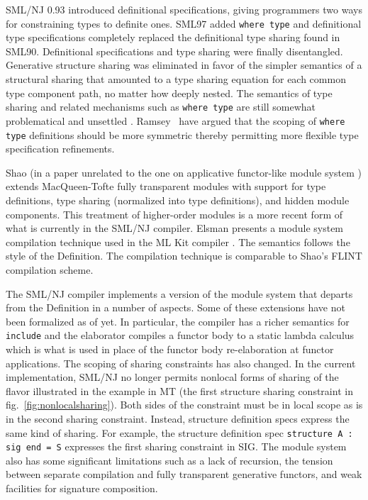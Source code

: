 SML/NJ 0.93 introduced definitional specifications, giving programmers two ways for constraining types to definite ones. SML97 added \lstinline{where type} and definitional type specifications completely replaced the definitional type sharing found in SML90. Definitional specifications and type sharing were finally disentangled. Generative structure sharing was eliminated in favor of the simpler semantics of a structural sharing that amounted to a type sharing equation for each common type component path, no matter how deeply nested. The semantics of type sharing and related mechanisms such as \lstinline{where type} are still somewhat problematical and unsettled \cite{narbel:jfp07,ramsey05}. Ramsey \etal~have argued that the scoping of \lstinline{where type} definitions should be more symmetric thereby permitting more flexible type specification refinements.

Shao \cite{shao98} (in a paper unrelated to the one on applicative functor-like module system \cite{shao99}) extends MacQueen-Tofte fully transparent modules with support for type definitions, type sharing (normalized into type definitions), and hidden module components. This treatment of higher-order modules is a more recent form of what is currently in the SML/NJ compiler. Elsman presents a module system compilation technique used in the ML Kit compiler \cite{elsman99}. The semantics follows the style of the Definition. The compilation technique is comparable to Shao's FLINT compilation scheme. 

The SML/NJ compiler implements a version of the module system that departs from the Definition in a number of aspects. Some of these extensions have not been formalized as of yet. In particular, the compiler has a richer semantics for \lstinline{include} and the elaborator compiles a functor body to a static lambda calculus which is what is used in place of the functor body re-elaboration at functor applications. The scoping of sharing constraints has also changed. In the current implementation, SML/NJ no longer permits nonlocal forms of sharing of the flavor illustrated in the example in MT (the first structure sharing constraint in fig.~\ref{fig:nonlocalsharing}). Both sides of the constraint must be in local scope as is in the second sharing constraint. Instead, structure definition specs express the same kind of sharing. For example, the structure definition spec \lstinline{structure A : sig end = S} expresses the first sharing constraint in SIG. The module system also has some significant limitations such as a lack of recursion, the tension between separate compilation and fully transparent generative functors, and weak facilities for signature composition.

